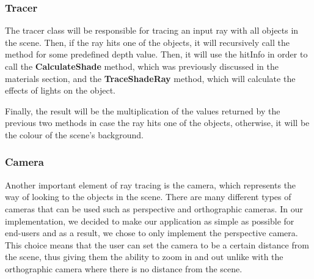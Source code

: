 \documentclass[a4paper]{report}
\begin{document}
	\subsubsection{Tracer}
	The tracer class will be responsible for tracing an input ray with all objects in the scene. Then, if the ray hits one of the objects, it will recursively call the method for some predefined depth value. Then, it will use the hitInfo in order to call the \textbf{CalculateShade} method, which was previously discussed in the materials section, and the \textbf{TraceShadeRay} method, which will calculate the effects of lights on the object.\newline
	\par Finally, the result will be the multiplication of the values returned by the previous two methods in case the ray hits one of the objects, otherwise, it will be the colour of the scene's background.
	\subsubsection{Camera}
	\label{sssec:cam} Another important element of ray tracing is the camera, which represents the way of looking to the objects in the scene. There are many different types of cameras that can be used such as perspective and orthographic cameras. In our implementation, we decided to make our application as simple as possible for end-users and as a result, we chose to only implement the perspective camera. This choice means that the user can set the camera to be a certain distance from the scene, thus giving them the ability to zoom in and out unlike with the orthographic camera where there is no distance from the scene.
	
\end{document}
